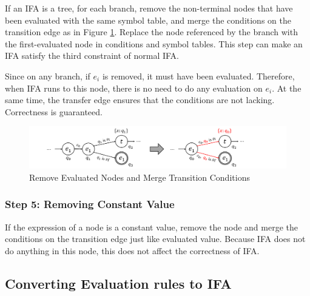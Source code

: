 If an IFA is a tree, for each branch, remove the non-terminal nodes that have been evaluated with the same symbol table, and merge the conditions on the transition edge as in Figure \ref{fig:nmlifa-merge}. Replace the node referenced by the branch with the first-evaluated node in conditions and symbol tables. This step can make an IFA satisfy the third constraint of normal IFA.

Since on any branch, if $e_i$ is removed, it must have been evaluated. Therefore, when IFA runs to this node, there is no need to do any evaluation on $e_i$. At the same time, the transfer edge ensures that the conditions are not lacking. Correctness is guaranteed.

\begin{figure}[t]
    \centering
    \includegraphics[scale=0.25]{images/nmlifa/nmlifa-merge.png}
    \caption{Remove Evaluated Nodes and Merge Transition Conditions}
    \label{fig:nmlifa-merge}
\end{figure}

\subsubsection*{Step 5: Removing Constant Value}

If the expression of a node is a constant value, remove the node and merge the conditions on the transition edge just like evaluated value. Because IFA does not do anything in this node, this does not affect the correctness of IFA.



\subsection{Converting Evaluation rules to IFA}


